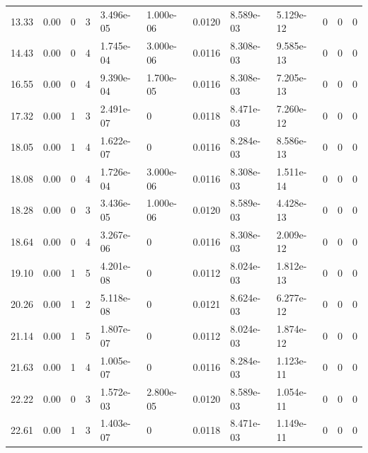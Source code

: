 \documentclass[preview]{standalone}
\begin{document}
{{\begin{tabular}{L{1.2cm}C{1.2cm} C{0.3cm}C{0.5cm} C{1.4cm}C{1.4cm} C{1.4cm}C{1.4cm} C{1.6cm}C{1.6cm} C{1.6cm}C{1.6cm}}
  13.33  &  0.00  & 0     &  3 &  3.496e-05  & 1.000e-06  &  0.0120&   8.589e-03& 5.129e-12 & 0   &  0 & 0  \\ 
  14.43  &  0.00  & 0     &  4 &  1.745e-04  & 3.000e-06  &  0.0116&   8.308e-03& 9.585e-13 & 0   &  0 & 0  \\ 
  16.55  &  0.00  & 0     &  4 &  9.390e-04  & 1.700e-05  &  0.0116&   8.308e-03& 7.205e-13 & 0   &  0 & 0  \\ 
  17.32  &  0.00  & 1     &  3 &  2.491e-07  & 0  &  0.0118&   8.471e-03& 7.260e-12 & 0   &  0 & 0  \\ 
  18.05  &  0.00  & 1     &  4 &  1.622e-07  & 0  &  0.0116&   8.284e-03& 8.586e-13 & 0   &  0 & 0  \\ 
  18.08  &  0.00  & 0     &  4 &  1.726e-04  & 3.000e-06  &  0.0116&   8.308e-03& 1.511e-14 & 0   &  0 & 0  \\ 
  18.28  &  0.00  & 0     &  3 &  3.436e-05  & 1.000e-06  &  0.0120&   8.589e-03& 4.428e-13 & 0   &  0 & 0  \\ 
  18.64  &  0.00  & 0     &  4 &  3.267e-06  & 0  &  0.0116&   8.308e-03& 2.009e-12 & 0   &  0 & 0  \\ 
  19.10  &  0.00  & 1     &  5 &  4.201e-08  & 0  &  0.0112&   8.024e-03& 1.812e-13 & 0   &  0 & 0  \\ 
  20.26  &  0.00  & 1     &  2 &  5.118e-08  & 0  &  0.0121&   8.624e-03& 6.277e-12 & 0   &  0 & 0  \\ 
  21.14  &  0.00  & 1     &  5 &  1.807e-07  & 0  &  0.0112&   8.024e-03& 1.874e-12 & 0   &  0 & 0  \\ 
  21.63  &  0.00  & 1     &  4 &  1.005e-07  & 0  &  0.0116&   8.284e-03& 1.123e-11 & 0   &  0 & 0  \\ 
  22.22  &  0.00  & 0     &  3 &  1.572e-03  & 2.800e-05  &  0.0120&   8.589e-03& 1.054e-11 & 0   &  0 & 0  \\ 
  22.61  &  0.00  & 1     &  3 &  1.403e-07  & 0  &  0.0118&   8.471e-03& 1.149e-11 & 0   &  0 & 0  \\ 
\hline 
\end{tabular} 

}}
\end{document}
